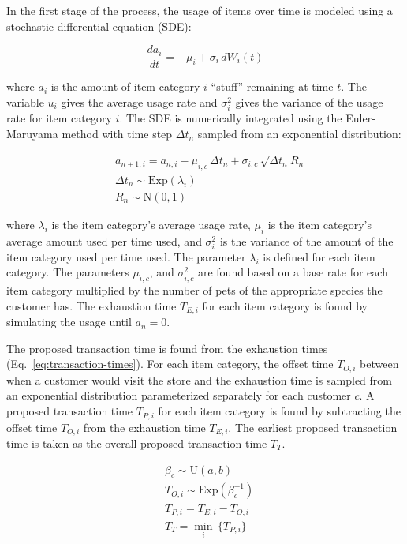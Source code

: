 \documentclass[conference]{IEEEtran}
\begin{document}
In the first stage of the process, the usage of items over time is modeled using a stochastic differential equation (SDE):

\begin{equation*}
\frac{da_i}{dt} = -\mu_i + \sigma_i\, dW_i(t)
\end{equation*}

where $a_i$ is the amount of item category $i$ ``stuff'' remaining at time $t$. The variable $u_i$ gives the average usage rate and $\sigma^2_i$ gives the variance of the usage rate for item category $i$. The SDE is numerically integrated using the Euler-Maruyama method\cite{Klouden13} with time step $\Delta t_n$ sampled from an exponential distribution:

\begin{align*}
&a_{n+1, i} = a_{n,i} - \mu_{i, c} \, \Delta t_n + \sigma_{i, c} \, \sqrt{\Delta t_n} R_n \\
&\Delta t_n \sim \text{Exp}(\lambda_i) \\
&R_n \sim \text{N}(0, 1)
\end{align*}

where $\lambda_i$ is the item category's average usage rate, $\mu_i$ is the item category's average amount used per time used, and $\sigma^2_i$ is the variance of the amount of the item category used per time used. The parameter $\lambda_i$ is defined for each item category.  The parameters $\mu_{i, c}$, and $\sigma^2_{i,c}$ are found based on a base rate for each item category multiplied by the number of pets of the appropriate species the customer has.  The exhaustion time $T_{E,i}$ for each item category is found by simulating the usage until $a_n = 0$.

The proposed transaction time is found from the exhaustion times (Eq.~\ref{eq:transaction-times}).  For each item category, the offset time $T_{O, i}$ between when a customer would visit the store and the exhaustion time is sampled from an exponential distribution parameterized separately for each customer $c$. A proposed transaction time $T_{P, i}$ for each item category is found by subtracting the offset time $T_{O, i}$ from the exhaustion time $T_{E, i}$.  The earliest proposed transaction time is taken as the overall proposed transaction time $T_T$.

\begin{align} \label{eq:transaction-times}
&\beta_c \sim \text{U}(a, b) \nonumber \\
&T_{O, i} \sim \text{Exp}(\beta^{-1}_c) \nonumber \\
&T_{P, i} = T_{E,i} - T_{O, i} \nonumber\\
&T_T = \min_i \, \{  T_{P, i}\}
\end{align}
\end{document}
